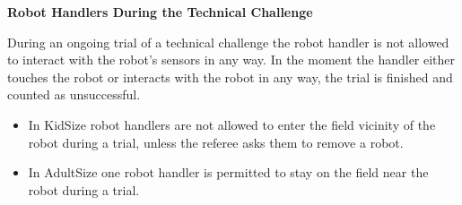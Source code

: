 \bigskip

{\bfseries Robot Handlers During the Technical Challenge}

\headlinebox

During an ongoing trial of a technical challenge the robot handler is not allowed to interact with the robot's sensors in any way. In the moment the handler either touches the robot or interacts with the robot in any way, the trial is finished and counted as unsuccessful.

\begin{itemize}
\item In KidSize robot handlers are not allowed to enter
      the field vicinity of the robot during a trial,
      unless the referee asks them to remove a robot.
\item In AdultSize one robot handler is permitted to stay on the field near the robot during a trial.
\end{itemize}
